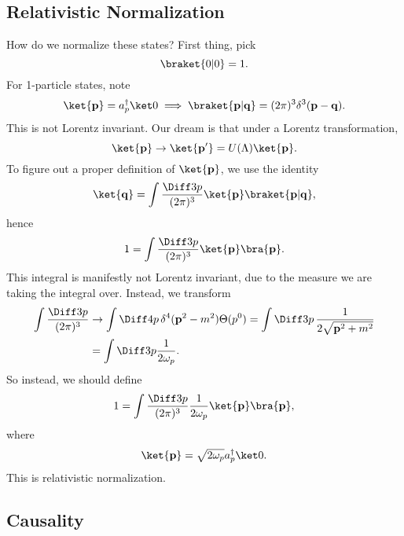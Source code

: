 \documentclass[12pt]{article}
\begin{document}
\subsection{Relativistic Normalization}%
\label{sub:rn}

How do we normalize these states? First thing, pick
\[
	\braket{0|0} = 1.
\]
For 1-particle states, note
\[
	\ket{\mathbf{p}} = a_p^\dagger \ket 0 \implies \braket{\mathbf{p}|\mathbf{q}} = (2\pi)^3 \delta^3(\mathbf{p} - \mathbf{q}).
\]
This is not Lorentz invariant. Our dream is that under a Lorentz transformation,
\[
	\ket{\mathbf{p}} \to \ket{\mathbf{p}'} = U(\Lambda) \ket{\mathbf{p}}.
\]
To figure out a proper definition of $\ket{\mathbf{p}}$, we use the identity
\[
	\ket{\mathbf{q}}=  \int \frac{\Diff3p}{(2\pi)^3} \ket{\mathbf{p}} \braket{\mathbf{p}|\mathbf{q}},
\]
hence
\[
	1 = \int \frac{\Diff3p}{(2\pi)^3} \ket{\mathbf{p}}\bra{\mathbf{p}}.
\]
This integral is manifestly not Lorentz invariant, due to the measure we are taking the integral over. Instead, we transform
\begin{align*}
	\int \frac{\Diff3p}{(2\pi)^3} &\to \int \Diff4p \, \delta^{4}(\mathbf{p}^2-m^2) \Theta(p^0) = \int \Diff3p\, \frac{1}{2\sqrt{\mathbf{p}^2 + m^2}} \\
				      &= \int \Diff3 p \frac{1}{2 \omega_p}.
\end{align*}
So instead, we should define
\[
	1 = \int \frac{\Diff3p}{(2\pi)^3} \frac{1}{2\omega_p} \ket{\mathbf{p}}\bra{\mathbf{p}},
\]
where
\[
	\ket{\mathbf{p}} = \sqrt{2\omega_p} a_p^\dagger \ket 0.
\]
This is relativistic normalization.

\subsection{Causality}%
\label{sub:cause}
\end{document}
